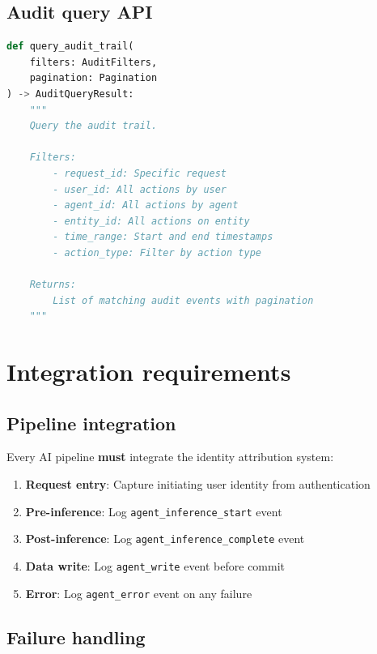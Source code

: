 \subsection{Audit query API}

\begin{lstlisting}[language=Python,basicstyle=\ttfamily\small,caption={Audit query API contract.}]
def query_audit_trail(
    filters: AuditFilters,
    pagination: Pagination
) -> AuditQueryResult:
    """
    Query the audit trail.
    
    Filters:
        - request_id: Specific request
        - user_id: All actions by user
        - agent_id: All actions by agent
        - entity_id: All actions on entity
        - time_range: Start and end timestamps
        - action_type: Filter by action type
    
    Returns:
        List of matching audit events with pagination
    """
\end{lstlisting}

\section{Integration requirements}

\subsection{Pipeline integration}

Every AI pipeline \textbf{must} integrate the identity attribution system:

\begin{enumerate}
  \item \textbf{Request entry}: Capture initiating user identity from authentication
  \item \textbf{Pre-inference}: Log \texttt{agent\_inference\_start} event
  \item \textbf{Post-inference}: Log \texttt{agent\_inference\_complete} event
  \item \textbf{Data write}: Log \texttt{agent\_write} event before commit
  \item \textbf{Error}: Log \texttt{agent\_error} event on any failure
\end{enumerate}

\subsection{Failure handling}\label{sec:audit-failure-handling}

